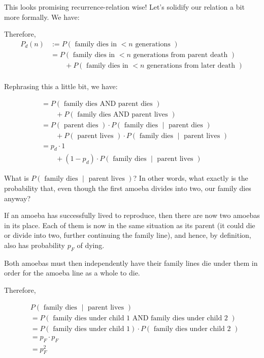 This looks promising recurrence-relation wise! Let's solidify our relation a bit more formally. We have:

Therefore, 
\begin{align*}
P_d(n) &:= P(\text{ family dies in $< n$ generations }) \\
&= P(\text{ family dies in $< n$ generations from parent death }) \\
&\qquad + P(\text{ family dies in $< n$ generations from later death }) \\ %
\end{align*}

Rephrasing this a little bit, we have:

\begin{align*}
&= P(\text{ family dies AND parent dies }) \\
&\qquad + P(\text{ family dies AND parent lives }) \\
&= P(\text{ parent dies }) \cdot P\left(\text{ family dies } \middle| \text{ parent dies }\right) \\
&\qquad + P(\text{ parent lives }) \cdot P\left(\text{ family dies } \middle| \text{ parent lives }\right) \\
&= p_d \cdot 1 \\
&\qquad + (1 - p_d) \cdot P\left(\text{ family dies } \middle| \text{ parent lives }\right)
\end{align*}

What is $P\left(\text{ family dies } \middle| \text{ parent lives }\right)$? In other words, what exactly is the probability that, even though the first amoeba divides into two, our family dies anyway?

If an amoeba has successfully lived to reproduce, then there are now two amoebas in its place. Each of them is now in the same situation as its parent (it could die or divide into two, further continuing the family line), and hence, by definition, also has probability $p_F$ of dying. 

Both amoebas must then independently have their family lines die under them in order for the amoeba line as a whole to die.

Therefore, 

\begin{align*}
&P\left(\text{ family dies } \middle| \text{ parent lives }\right) \\
&= P\left(\text{ family dies under child 1 AND family dies under child 2 } \right) \\
&= P\left(\text{ family dies under child 1} \right) \cdot P\left(\text{ family dies under child 2 } \right) \\
&= p_F \cdot p_F \\
&= p_F^2
\end{align*}

